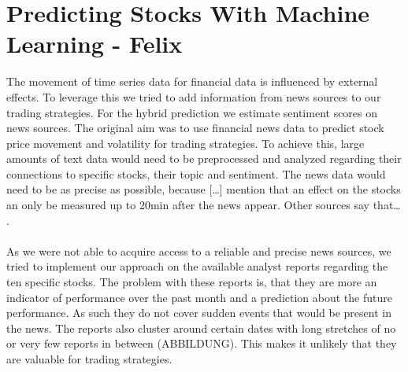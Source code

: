 \chapter{Predicting Stocks With Machine Learning - Felix} \label{ch:predictions_ml}
The movement of time series data for financial data is influenced by external effects. To leverage this we tried to add information from news sources to our trading strategies. For the hybrid prediction we estimate sentiment scores on news sources. The original aim was to use financial news data to predict stock price movement and volatility for trading strategies. To achieve this, large amounts of text data would need to be preprocessed and analyzed regarding their connections to specific stocks, their topic and sentiment. The news data would need to be as precise as possible, because […] mention that an effect on the stocks an only be measured up to 20min after the news appear. Other sources say that… .
\\ \\
As we were not able to acquire access to a reliable and precise news sources, we tried to implement our approach on the available analyst reports regarding the ten specific stocks. The problem with these reports is, that they are more an indicator of performance over the past month and a prediction about the future performance. As such they do not cover sudden events that would be present in the news. The reports also cluster around certain dates with long stretches of no or very few reports in between (ABBILDUNG). This makes it unlikely that they are valuable for trading strategies.
%    
\\  \\
